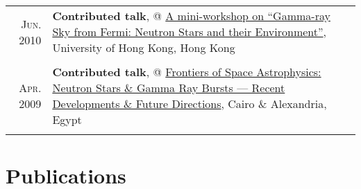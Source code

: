 \documentclass[letterpaper,11pt]{article}
\begin{document}
\begin{longtable}{r|p{5.6in}}
    \textsc{Jun. 2010}   &   \textbf{Contributed talk}, @ \href{http://www.physics.hku.hk/~astro/2010Astro/Index.htm}{A mini-workshop on ``Gamma-ray Sky from Fermi: Neutron Stars and their Environment''}, University of Hong Kong, Hong Kong   \\
    \multicolumn{2}{c}{} \\

    \textsc{Apr. 2009}   &   \textbf{Contributed talk}, @ \href{http://www.ns-grb.com/index0.html}{Frontiers of Space Astrophysics: Neutron Stars \& Gamma Ray Bursts --- Recent Developments \& Future Directions}, Cairo \& Alexandria, Egypt     \\
    \multicolumn{2}{c}{} \\

\end{longtable}
\endgroup

\section{Publications}
\vspace{-.8em}
\end{document}
